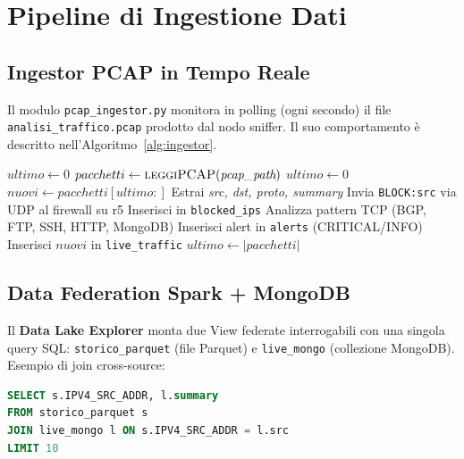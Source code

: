 \documentclass[10pt,a4paper]{article}
\begin{document}
\section{Pipeline di Ingestione Dati}

\subsection{Ingestor PCAP in Tempo Reale}
Il modulo \texttt{pcap\_ingestor.py} monitora in polling (ogni secondo) il file
\texttt{analisi\_traffico.pcap} prodotto dal nodo sniffer. Il suo comportamento è descritto
nell'Algoritmo~\ref{alg:ingestor}.

\begin{algorithm}[H]
\caption{PCAP Ingestor}
\label{alg:ingestor}
\begin{algorithmic}[1]
\State $ultimo \gets 0$
  \State $pacchetti \gets \Call{leggiPCAP}{\textit{pcap\_path}}$
    \State $ultimo \gets 0$ 
  \EndIf
    \State $nuovi \gets pacchetti[ultimo:]$
      \State Estrai \textit{src, dst, proto, summary}
        \State Invia \texttt{BLOCK:src} via UDP al firewall su r5
        \State Inserisci in \texttt{blocked\_ips}
      \EndIf
      \State Analizza pattern TCP (BGP, FTP, SSH, HTTP, MongoDB)
        \State Inserisci alert in \texttt{alerts} (CRITICAL/INFO)
      \EndIf
    \EndFor
    \State Inserisci $nuovi$ in \texttt{live\_traffic}
    \State $ultimo \gets |pacchetti|$
  \EndIf
  \State {}
\EndWhile
\end{algorithmic}
\end{algorithm}

\subsection{Data Federation Spark + MongoDB}
Il \textbf{Data Lake Explorer} monta due View federate interrogabili con una singola query SQL:
\texttt{storico\_parquet} (file Parquet) e \texttt{live\_mongo} (collezione MongoDB).
Esempio di join cross-source:

\begin{lstlisting}[language=SQL, caption={Esempio di query federata Parquet + MongoDB}]
SELECT s.IPV4_SRC_ADDR, l.summary
FROM storico_parquet s
JOIN live_mongo l ON s.IPV4_SRC_ADDR = l.src
LIMIT 10
\end{lstlisting}
\end{document}

